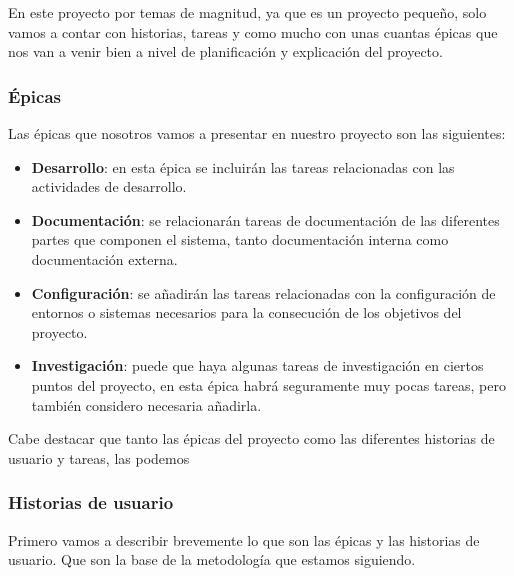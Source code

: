 En este proyecto por temas de magnitud, ya que es un proyecto pequeño, solo vamos a contar con historias, tareas y como mucho con unas cuantas épicas que nos van a venir bien a nivel de planificación y explicación del proyecto.

\subsubsection{Épicas}

Las épicas que nosotros vamos a presentar en nuestro proyecto son las siguientes: 
\begin{itemize}
    \item \textbf{Desarrollo}: en esta épica se incluirán las tareas relacionadas con las actividades de desarrollo.
    \item \textbf{Documentación}: se relacionarán tareas de documentación de las diferentes partes que componen el sistema, tanto documentación interna como documentación externa.
    \item \textbf{Configuración}: se añadirán las tareas relacionadas con la configuración de entornos o sistemas necesarios para la consecución de los objetivos del proyecto. 
    \item \textbf{Investigación}: puede que haya algunas tareas de investigación en ciertos puntos del proyecto, en esta épica habrá seguramente muy pocas tareas, pero también considero necesaria añadirla.
\end{itemize}

Cabe destacar que tanto las épicas del proyecto como las diferentes historias de usuario y tareas, las podemos 

\subsubsection{Historias de usuario}

Primero vamos a describir brevemente lo que son las épicas y las historias de usuario. Que son la base de la metodología que estamos siguiendo.

